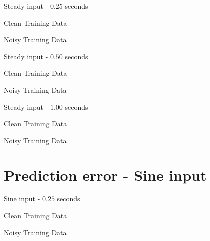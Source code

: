 \documentclass{beamer}
\begin{document}
\begin{frame}{Steady input - $0.25$ seconds}
    \scriptsize
    \begin{table}[!ht]
        \centering
        \caption{Clean Training Data}
    \end{table}

    \begin{table}[!ht]
        \centering
        \caption{Noisy Training Data}
    \end{table}
\end{frame}

\begin{frame}{Steady input - $0.50$ seconds}
    \scriptsize
    \begin{table}[!ht]
        \centering
        \caption{Clean Training Data}
    \end{table}

    \begin{table}[!ht]
        \centering
        \caption{Noisy Training Data}
    \end{table}
\end{frame}

\begin{frame}{Steady input - $1.00$ seconds}
    \scriptsize
    \begin{table}[!ht]
        \centering
        \caption{Clean Training Data}
    \end{table}

    \begin{table}[!ht]
        \centering
        \caption{Noisy Training Data}
    \end{table}
\end{frame}


\section{Prediction error - Sine input}

\begin{frame}{Sine input - $0.25$ seconds}
    \scriptsize
    \begin{table}[!ht]
        \centering
        \caption{Clean Training Data}
    \end{table}

    \begin{table}[!ht]
        \centering
        \caption{Noisy Training Data}
    \end{table}
\end{frame}
\end{document}
